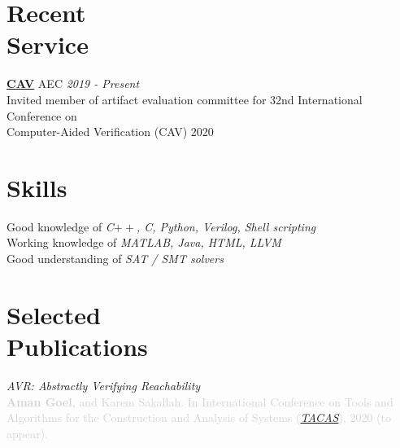 \documentclass[margin,line,letter]{resume}
\begin{document}
\begin{resume}
\section{\mysidestyle Recent\\Service}
    \href{http://i-cav.org/2020/}{\textbf{CAV}} AEC \hfill \emph{2019 - Present}\\
    \phantom{xx}\hspace{1ex} Invited member of artifact evaluation committee for 32nd International Conference on \\
    \phantom{xx}\hspace{1ex} Computer-Aided Verification (CAV) 2020

    


\section{\mysidestyle Skills}
    Good knowledge of \emph{C$++$, C, Python, Verilog, Shell scripting} \\
    Working knowledge of \emph{MATLAB, Java, HTML, LLVM}  \\
    Good understanding of \emph{SAT / SMT solvers}

\section{\mysidestyle Selected\\Publications \\ 
\href{https://scholar.google.com/citations?user=iFCl5vEAAAAJ&hl=en&oi=sra}{\faGraduationCap}}

\hspace{-2em} \href{https://aman-goel.github.io/publications/goel2020avr_submission_version.pdf}{\faFilePdfO} \hspace{0.3em}
\textit{AVR: Abstractly Verifying Reachability} \\
\textcolor{lightgray}{\textbf{Aman Goel}, and Karem Sakallah. In International Conference on Tools and Algorithms for the Construction and Analysis of Systems (\href{https://www.etaps.org/2020/tacas}{\textit{TACAS}}), 2020 (to appear).}


\end{resume}
\end{document}
